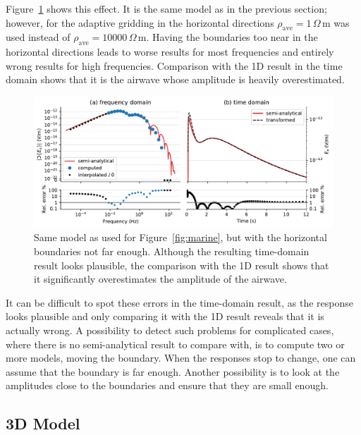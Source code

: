 \documentclass[onecolumn,extra,referee,camera]{gji}
\newlength{\fwidth}
\newcommand{\mr}[1]{\mathrm{#1}}
\newcommand{\ohmm}{\ensuremath{\Omega\,}\text{m}\xspace}
\begin{document}
Figure~\ref{fig:marine-wrong-x-y} shows this effect. It is the same model as in
the previous section; however, for the adaptive gridding in the horizontal
directions $\rho_\mr{ave}=1\,\ohmm$ was used instead of
$\rho_\mr{ave}=\num{10000}\,\ohmm$. Having the boundaries too near in the
horizontal directions leads to worse results for most frequencies and entirely
wrong results for high frequencies. Comparison with the 1D result in the time
domain shows that it is the airwave whose amplitude is heavily overestimated.
%
\begin{figure}
  \centering
  \includegraphics[width=\fwidth]{08-marine-wrong-x-y}
  \caption{Same model as used for Figure~\ref{fig:marine}, but with the
    horizontal boundaries not far enough. Although the resulting time-domain
    result looks plausible, the comparison with the 1D result shows that it
    significantly overestimates the amplitude of the airwave.}
  \label{fig:marine-wrong-x-y}
\end{figure}
%
It can be difficult to spot these errors in the time-domain result, as the
response looks plausible and only comparing it with the 1D result reveals that
it is actually wrong. A possibility to detect such problems for complicated
cases, where there is no semi-analytical result to compare with, is to compute
two or more models, moving the boundary. When the responses stop to change, one
can assume that the boundary is far enough. Another possibility is to look at
the amplitudes close to the boundaries and ensure that they are small enough.


\subsection{3D Model} %
\end{document}
